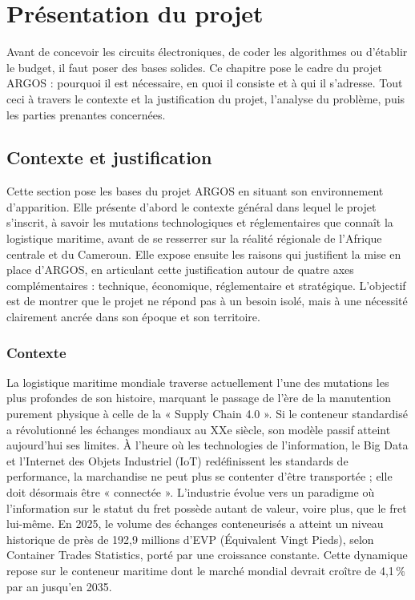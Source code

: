 \chapter{Présentation du projet}
\label{chap-presentation}

Avant de concevoir les circuits électroniques, de coder les algorithmes ou d’établir le budget, il faut poser des bases solides. Ce chapitre pose le cadre du projet ARGOS : pourquoi il est nécessaire, en quoi il consiste et à qui il s’adresse. Tout ceci à travers le contexte et la justification du projet, l’analyse du problème, puis les parties prenantes concernées.

\section{Contexte et justification}

Cette section pose les bases du projet ARGOS en situant son environnement d'apparition. Elle présente d'abord le contexte général dans lequel le projet s'inscrit, à savoir les mutations technologiques et réglementaires que connaît la logistique maritime, avant de se resserrer sur la réalité régionale de l'Afrique centrale et du Cameroun. Elle expose ensuite les raisons qui justifient la mise en place d'ARGOS, en articulant cette justification autour de quatre axes complémentaires : technique, économique, réglementaire et stratégique. L'objectif est de montrer que le projet ne répond pas à un besoin isolé, mais à une nécessité clairement ancrée dans son époque et son territoire.

\subsection{Contexte}

La logistique maritime mondiale traverse actuellement l’une des mutations les plus profondes de son histoire, marquant le passage de l’ère de la manutention purement physique à celle de la « Supply Chain 4.0 ». Si le conteneur standardisé a révolutionné les échanges mondiaux au XXe siècle, son modèle passif atteint aujourd’hui ses limites. À l’heure où les technologies de l’information, le Big Data et l’Internet des Objets Industriel (IoT) redéfinissent les standards de performance, la marchandise ne peut plus se contenter d’être transportée ; elle doit désormais être « connectée ». L’industrie évolue vers un paradigme où l’information sur le statut du fret possède autant de valeur, voire plus, que le fret lui-même. En 2025, le volume des échanges conteneurisés a atteint un niveau historique de près de 192,9 millions d’EVP (Équivalent Vingt Pieds), selon Container Trades Statistics\cite{cts2025}, porté par une croissance constante. Cette dynamique repose sur le conteneur maritime dont le marché mondial devrait croître de 4,1\,\% par an jusqu’en 2035\cite{gmi2025}.

